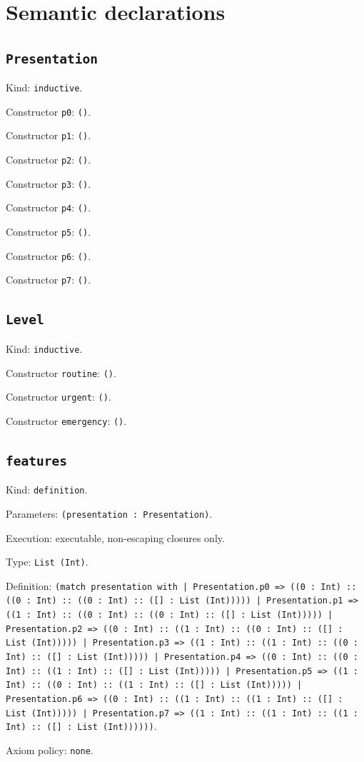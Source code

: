 \documentclass[11pt]{article}
\begin{document}
\section*{Semantic declarations}
\subsection*{\texttt{Presentation}}
\noindent Kind: \texttt{inductive}.\par
\noindent Constructor \texttt{p0}: \texttt{()}.\par
\noindent Constructor \texttt{p1}: \texttt{()}.\par
\noindent Constructor \texttt{p2}: \texttt{()}.\par
\noindent Constructor \texttt{p3}: \texttt{()}.\par
\noindent Constructor \texttt{p4}: \texttt{()}.\par
\noindent Constructor \texttt{p5}: \texttt{()}.\par
\noindent Constructor \texttt{p6}: \texttt{()}.\par
\noindent Constructor \texttt{p7}: \texttt{()}.\par
\subsection*{\texttt{Level}}
\noindent Kind: \texttt{inductive}.\par
\noindent Constructor \texttt{routine}: \texttt{()}.\par
\noindent Constructor \texttt{urgent}: \texttt{()}.\par
\noindent Constructor \texttt{emergency}: \texttt{()}.\par
\subsection*{\texttt{features}}
\noindent Kind: \texttt{definition}.\par
\noindent Parameters: \texttt{(presentation : Presentation)}.\par
\noindent Execution: executable, non-escaping closures only.\par
\noindent Type: \texttt{List (Int)}.\par
\noindent Definition: \texttt{(match presentation with | Presentation.p0 => ((0 : Int) :: ((0 : Int) :: ((0 : Int) :: ([] : List (Int))))) | Presentation.p1 => ((1 : Int) :: ((0 : Int) :: ((0 : Int) :: ([] : List (Int))))) | Presentation.p2 => ((0 : Int) :: ((1 : Int) :: ((0 : Int) :: ([] : List (Int))))) | Presentation.p3 => ((1 : Int) :: ((1 : Int) :: ((0 : Int) :: ([] : List (Int))))) | Presentation.p4 => ((0 : Int) :: ((0 : Int) :: ((1 : Int) :: ([] : List (Int))))) | Presentation.p5 => ((1 : Int) :: ((0 : Int) :: ((1 : Int) :: ([] : List (Int))))) | Presentation.p6 => ((0 : Int) :: ((1 : Int) :: ((1 : Int) :: ([] : List (Int))))) | Presentation.p7 => ((1 : Int) :: ((1 : Int) :: ((1 : Int) :: ([] : List (Int))))))}.\par
\noindent Axiom policy: \texttt{none}.\par
\end{document}
